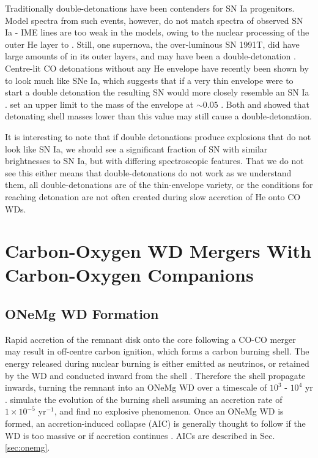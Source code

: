Traditionally double-detonations have been contenders for SN Ia progenitors.  Model spectra from such events, however, do not match spectra of observed SN Ia - IME lines are too weak in the models, owing to the nuclear processing of the outer He layer to {\Ni} \citep{woosk10,finkhr07,vkercj10,howe10}.  Still, one supernova, the over-luminous SN 1991T, did have large amounts of {\Ni} in its outer layers, and may have been a double-detonation \citep{finkhr07}.  Centre-lit CO detonations without any He envelope have recently been shown by \cite{sim+10} to look much like SNe Ia, which suggests that if a very thin envelope were to start a double detonation the resulting SN would more closely resemble an SN Ia \citep{howe10}. \citeauthor{woosk10} set an upper limit to the mass of the envelope at $\sim 0.05$ {\Msun}.  Both \citeauthor{woosk10} and \citeauthor{fink+10} showed that detonating shell masses lower than this value may still cause a double-detonation.

It is interesting to note that if double detonations produce explosions that do not look like SN Ia, we should see a significant fraction of SN with similar brightnesses to SN Ia, but with differing spectroscopic features.  That we do not see this either means that double-detonations do not work as we understand them, all double-detonations are of the thin-envelope variety, or the conditions for reaching detonation are not often created during slow accretion of He onto CO WDs.

\section{Carbon-Oxygen WD Mergers With Carbon-Oxygen Companions}
\label{sec:withcarbon-oxygencompanions}

\subsection{ONeMg WD Formation}

Rapid accretion of the remnant disk onto the core following a CO-CO merger may result in off-centre carbon ignition, which forms a carbon burning shell.  The energy released during nuclear burning is either emitted as neutrinos, or retained by the WD and conducted inward from the shell \citep{saion98}.  Therefore the shell propagate inwards, turning the remnant into an ONeMg WD over a timescale of $10^{3}$ - $10^{4}$ yr \citep{yoonpr07,saion98}.  \citeauthor{saion98} simulate the evolution of the burning shell assuming an accretion rate of $1 \times 10^{-5}$ {\Msun} yr$^{-1}$, and find no explosive phenomenon.  Once an ONeMg WD is formed, an accretion-induced collapse (AIC) is generally thought to follow if the WD is too massive or if accretion continues \citep{yoonpr07,saion98}.  AICs are described in Sec. \ref{sec:onemg}.

